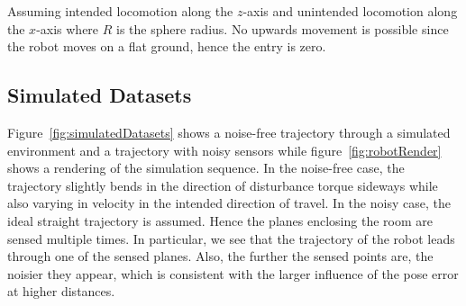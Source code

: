 Assuming intended locomotion along the $z$-axis and unintended locomotion along the $x$-axis where $R$ is the sphere radius.
No upwards movement is possible since the robot moves on a flat ground, hence the entry is zero.

\subsection{Simulated Datasets}

Figure~\ref{fig:simulatedDatasets} shows a noise-free trajectory through a simulated environment and a trajectory with noisy sensors while figure~\ref{fig:robotRender} shows a rendering of the simulation sequence.
In the noise-free case, the trajectory slightly bends in the direction of disturbance torque sideways while also varying in velocity in the intended direction of travel.
In the noisy case, the ideal straight trajectory is assumed.
Hence the planes enclosing the room are sensed multiple times. 
In particular, we see that the trajectory of the robot leads through one of the sensed planes. 
Also, the further the sensed points are, the noisier they appear, which is consistent with the larger influence of the pose error at higher distances.  

